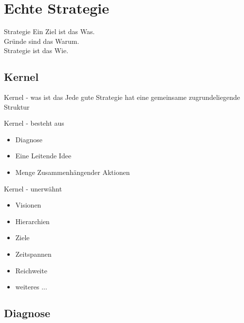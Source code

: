 \section{Echte Strategie}

\begin{frame}[c]{Strategie}
    \Large
    Ein Ziel ist das Was. \\
    Gründe sind das Warum. \\
    \pause
    Strategie ist das Wie.
\end{frame}


\subsection{Kernel}


\begin{frame}[c]{Kernel - was ist das}
    \Large
    Jede gute Strategie hat eine gemeinsame zugrundeliegende Struktur
\end{frame}


\begin{frame}[c]{Kernel - besteht aus}
    \Large
    \begin{itemize}
        \item Diagnose
            \pause
        \item Eine Leitende Idee
            \pause
        \item Menge Zusammenhängender Aktionen
    \end{itemize}
\end{frame}


\begin{frame}[c]{Kernel - unerwähnt}
    \Large
    \begin{itemize}
        \item Visionen
        \item Hierarchien
            \pause
        \item Ziele
        \item Zeitspannen
            \pause
        \item Reichweite
        \item weiteres ...
    \end{itemize}
\end{frame}


\subsection{Diagnose}


